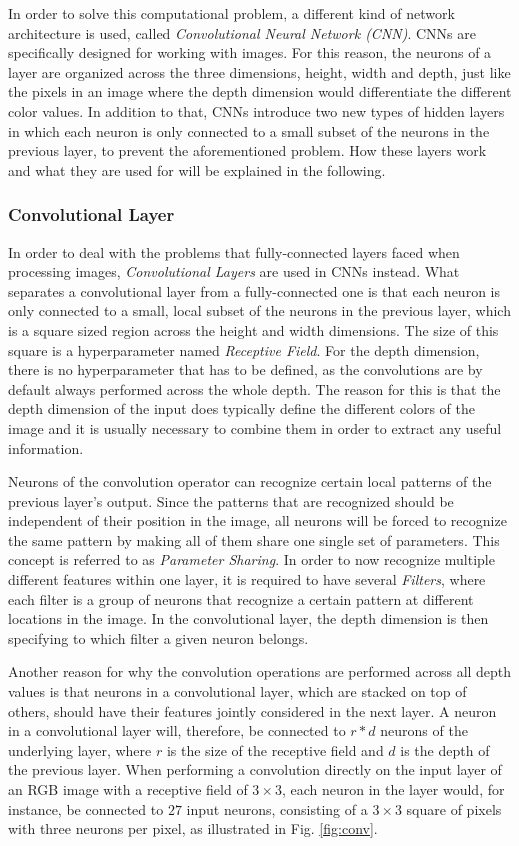 \documentclass[conference]{IEEEtran}
\begin{document}
In order to solve this computational problem, a different kind of network architecture is used, called \emph{Convolutional Neural Network (CNN)}. CNNs are specifically designed for working with images. For this reason, the neurons of a layer are organized across the three dimensions, height, width and depth, just like the pixels in an image where the depth dimension would differentiate the different color values. In addition to that, CNNs introduce two new types of hidden layers in which each neuron is only connected to a small subset of the neurons in the previous layer, to prevent the aforementioned problem. How these layers work and what they are used for will be explained in the following.

\subsubsection{Convolutional Layer}\label{subsubsec:convolution}
In order to deal with the problems that fully-connected layers faced when processing images, \emph{Convolutional Layers} are used in CNNs instead. What separates a convolutional layer from a fully-connected one is that each neuron is only connected to a small, local subset of the neurons in the previous layer, which is a square sized region across the height and width dimensions. The size of this square is a hyperparameter named \emph{Receptive Field}. For the depth dimension, there is no hyperparameter that has to be defined, as the convolutions are by default always performed across the whole depth. The reason for this is that the depth dimension of the input does typically define the different colors of the image and it is usually necessary to combine them in order to extract any useful information.

Neurons of the convolution operator can recognize certain local patterns of the previous layer's output. Since the patterns that are recognized should be independent of their position in the image, all neurons will be forced to recognize the same pattern by making all of them share one single set of parameters. This concept is referred to as \emph{Parameter Sharing}. In order to now recognize multiple different features within one layer, it is required to have several \emph{Filters}, where each filter is a group of neurons that recognize a certain pattern at different locations in the image. In the convolutional layer, the depth dimension is then specifying to which filter a given neuron belongs.

Another reason for why the convolution operations are performed across all depth values is that neurons in a convolutional layer, which are stacked on top of others, should have their features jointly considered in the next layer. A neuron in a convolutional layer will, therefore, be connected to $r * d$ neurons of the underlying layer, where $r$ is the size of the receptive field and $d$ is the depth of the previous layer. When performing a convolution directly on the input layer of an RGB image with a receptive field of $3\times3$, each neuron in the layer would, for instance, be connected to $27$ input neurons, consisting of a $3\times3$ square of pixels with three neurons per pixel, as illustrated in Fig. \ref{fig:conv}.
\end{document}
